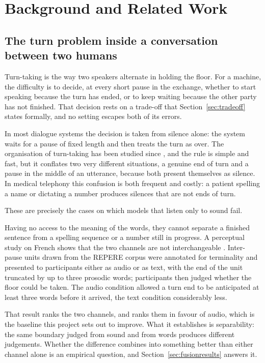 \chapter{Background and Related Work}
\label{ch:background}

\section{The turn problem inside a conversation between two humans}
\label{sec:turntaking}

Turn-taking is the way two speakers alternate in holding the floor. For a machine, the
difficulty is to decide, at every short pause in the exchange, whether to start speaking
because the turn has ended, or to keep waiting because the other party has not finished.
That decision rests on a trade-off that Section~\ref{sec:tradeoff} states formally, and no
setting escapes both of its errors. 

In most dialogue systems the decision is taken from
silence alone: the system waits for a pause of fixed length and then treats the turn as
over. The organisation of turn-taking has been studied since \citet{sacks1974turntaking},
and the rule is simple and fast, but it conflates two very different situations, a
genuine end of turn and a pause in the middle of an utterance, because both present
themselves as silence. In medical telephony this confusion is both frequent and costly: a
patient spelling a name or dictating a number produces silences that are not ends of turn.

These are precisely the cases on which models that listen only to sound fail. 

Having no access to the meaning of the words, they cannot separate a finished sentence from a
spelling sequence or a number still in progress. A perceptual study on French shows that the two channels are not interchangeable
\citep{uro2024perceptive}. Inter-pause units drawn from the REPERE corpus were annotated
for terminality and presented to participants either as audio or as text, with the end of
the unit truncated by up to three prosodic words; participants then judged whether the floor
could be taken. The audio condition allowed a turn end to be anticipated at least three
words before it arrived, the text condition considerably less.

That result ranks the two channels, and ranks them in favour of audio, which is the baseline
this project sets out to improve. What it establishes is separability: the same boundary
judged from sound and from words produces different judgements. Whether the difference
combines into something better than either channel alone is an empirical question, and
Section~\ref{sec:fusionresults} answers it.

